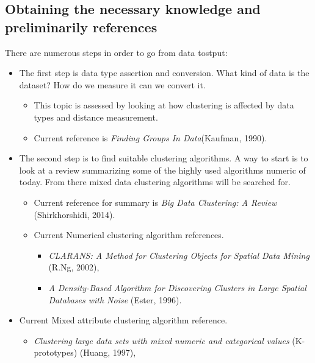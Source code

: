 \documentclass[a4paper,11pt]{article}
\begin{document}
\subsection{Obtaining the necessary knowledge and preliminarily
references}

There are numerous steps in order to go from data tostput:


\begin{itemize}
\item
  The first step is data type assertion and conversion. What kind of
  data is the dataset? How do we measure it can we convert it.

  \begin{itemize}
    \item
      This topic is assessed by looking at how clustering is affected by
      data types and distance measurement.
    \item
      Current reference is \textit{Finding Groups In Data}(Kaufman, 1990)\cite{doi:10.1002/9780470316801.ch1}.
  \end{itemize}
\item
  The second step is to find suitable clustering algorithms. A way to
  start is to look at a review summarizing some of the highly used
  algorithms numeric of today. From there mixed data clustering algorithms will be searched for.
  \begin{itemize}
  \item
    Current reference for summary is \textit{Big Data Clustering: A
    Review} (Shirkhorshidi, 2014)\cite{Shirkhorshidi2014}.
  \item
    Current Numerical clustering algorithm references.
      \begin{itemize}
        \item \textit{CLARANS: A Method for Clustering Objects for Spatial Data Mining} (R.Ng, 2002)\cite{Ng2002},
        \item \textit{A Density-Based Algorithm for Discovering Clusters in
    Large Spatial Databases with Noise} (Ester, 1996)\cite{Ester1996}.
      \end{itemize}
  \end{itemize}
  \item
    Current Mixed attribute clustering algorithm reference.
      \begin{itemize}
        \item \textit{Clustering large data sets with mixed numeric and categorical values} (K-prototypes) (Huang, 1997)\cite{Huang97clusteringlarge},
      \end{itemize}
\end{itemize}
\end{document}
